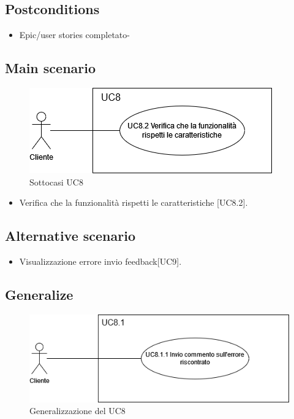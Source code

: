 \documentclass{article}
\begin{document}
    \subsection*{Postconditions}
    \begin{itemize}
        \item Epic/user stories completato-
    \end{itemize}
    
    \subsection*{Main scenario}
        \begin{figure}[h]
            \centering
            \includegraphics[width=.8\textwidth, height=.6\textheight, keepaspectratio]{documenti/imgUML/UC8-zoom.drawio.png}
            \caption{Sottocasi UC8}
            \label{fig:UC8_sottocasi}
        \end{figure}
        \begin{itemize}
            \item Verifica che la funzionalità rispetti le caratteristiche [UC8.2].
        \end{itemize}
        
    \subsection*{Alternative scenario}
    \begin{itemize}
        \item Visualizzazione errore invio feedback[UC9].
    \end{itemize}

    \subsection*{Generalize}
    \begin{figure}[h]
            \centering
            \includegraphics[width=.8\textwidth, height=.6\textheight, keepaspectratio]{documenti/imgUML/UC8.1-FEEDBACK-NEGATIVO.drawio.png}
            \caption{Generalizzazione del UC8}
            \label{fig:UC8_generalizzazione}
        \end{figure}
\end{document}
